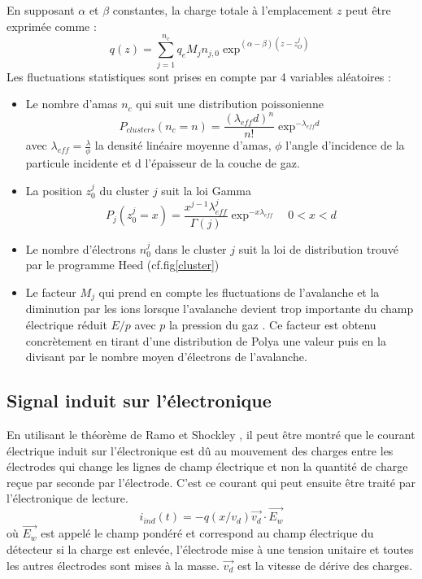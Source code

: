En supposant $\alpha$ et $\beta$ constantes, la charge totale à l'emplacement $z$ peut être exprimée comme :
\begin{equation}
q(z)=\sum_{j=1}^{n_c}q_{e}M_{j}n_{j,0}\exp^{(\alpha-\beta)(z-z_O^j)}
\end{equation}
Les fluctuations statistiques sont prises en compte par 4 variables aléatoires :
\begin{itemize}[label=$\bullet$]
	\item Le nombre d'amas $n_c$ qui suit une distribution poissonienne 
	\begin{equation}
	P_{clusters}(n_c=n)=\frac{(\lambda_{eff}d)^{n}}{n!}\exp^{-\lambda_{eff}d}
	\end{equation}
	avec $\lambda_{eff}=\frac{\lambda}{\phi}$ la densité linéaire moyenne d'amas, $\phi$ l'angle d'incidence de la particule incidente et d l'épaisseur de la couche de gaz.
	\item La position $z_0^j$ du cluster $j$ suit la loi Gamma
	\begin{equation}
	P_{j}(z_0^j=x)=\frac{x^{j-1}\lambda_{eff}^{j}}{\Gamma(j)}\exp^{-x\lambda_{eff}} \quad 0<x<d
	\end{equation}
	\item Le nombre d'électrons $n_{0}^{j}$ dans le cluster $j$ suit la loi de distribution trouvé par le programme Heed (cf.fig\ref{cluster}) 
	\item Le facteur $M_{j}$ qui prend en compte les fluctuations de l'avalanche et la diminution par les ions lorsque l'avalanche devient trop importante du champ électrique réduit $E/p$ avec $p$ la pression du gaz . Ce facteur est obtenu concrètement en tirant d'une distribution de Polya une valeur puis en la divisant par le nombre moyen d'électrons de l'avalanche.
\end{itemize}

\subsection{Signal induit sur l'électronique}
En utilisant le théorème de Ramo et Shockley \cite{HE2001250}, il peut être montré que le courant électrique induit sur l'électronique est dû au mouvement des charges entre les électrodes qui change les lignes de champ électrique et non la quantité de charge reçue par seconde par l'électrode. C'est ce courant qui peut ensuite être traité par l'électronique de lecture.
\begin{equation}
i_{ind}(t)=-q(x/v_{d})\vec{v_{d}}\cdot \vec{E_{w}}
\end{equation}
où $\vec{E_{w}}$ est appelé le champ pondéré et correspond au champ électrique du détecteur si la charge est enlevée, l'électrode mise à une tension unitaire  et toutes les autres électrodes sont mises à la masse. $\vec{v_{d}}$ est la vitesse de dérive des charges.

